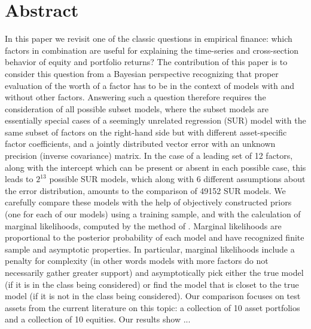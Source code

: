 \documentclass[12pt]{article}
\begin{document}
\section{Abstract}
    In this paper we revisit one of the classic questions in empirical finance: which factors in combination are useful for explaining the time-series and cross-section behavior of equity and portfolio returns? The contribution of this paper is to consider this question from a Bayesian perspective recognizing that proper evaluation of the worth of a factor has to be in the context of models with and without other factors. Answering such a question therefore requires the consideration of all possible subset models, where the subset models are essentially special cases of a seemingly unrelated regression (SUR) model with the same subset of factors on the right-hand side but with different asset-specific factor coefficients, and a jointly distributed vector error with an unknown precision (inverse covariance) matrix. In the case of a leading set of 12 factors, along with the intercept which can be present or absent in each possible case, this leads to $2^13$ possible SUR models, which along with 6 different assumptions about the error distribution, amounts to the comparison of 49152 SUR models. We carefully compare these models with the help of objectively constructed priors (one for each of our models) using a training sample, and with the calculation of marginal likelihoods, computed by the method of \cite{chib1995marginal}. Marginal likelihoods are proportional to the posterior probability of each model and have recognized finite sample and asymptotic properties. In particular, marginal likelihoods include a penalty for complexity (in other words models with more factors do not necessarily gather greater support) and asymptotically pick either the true model (if it is in the class being considered) or find the model that is closet to the true model (if it is not in the class being considered). Our comparison focuses on test assets from the current literature on this topic: a collection of 10 asset portfolios and a collection of 10 equities. Our results show ...
\end{document}
